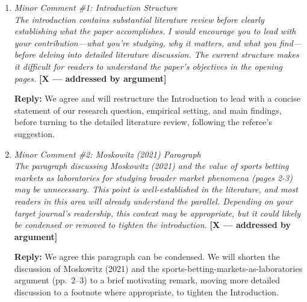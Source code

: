 \documentclass[letterpaper,12pt]{article}
\newcounter{b}
\newcommand{\argX}{\textcolor{green!55!black}{\textbf{[X --- addressed by argument]}}}
\newcommand{\Reply}[1]{\par\noindent\textbf{Reply:} #1}
\begin{document}
\begin{enumerate}
\Reply{We agree the learning-rate magnitudes need a more concrete interpretation. Because our estimating relationship implies $p_t - \omega = \varepsilon / t^\gamma \cdot \sigma$, the implied pricing error shrinks proportionally to $t^{-\gamma}$. We can use this relationship to translate $\gamma$ into an interpretable half-life: the (percentile) time needed for the expected squared pricing error to halve, relative to a reference percentile $t_0$, is $t_{1/2} = 2^{1/(2\gamma)} \cdot t_0$. We will add this calculation to Section~5.5, evaluated at our estimated average learning rate and, separately, at the favorite and longshot medians reported in Section~5.5, together with a short worked numerical example, so that readers can translate an abstract learning-rate estimate into an intuitive statement about how much of the betting window is needed for the pricing error to fall by half.}



\item \textit{Minor Comment \#1: Introduction Structure\\[6pt]
The introduction contains substantial literature review before clearly establishing what the paper accomplishes. I would encourage you to lead with your contribution—what you're studying, why it matters, and what you find—before delving into detailed literature discussion. The current structure makes it difficult for readers to understand the paper's objectives in the opening pages.} \argX

\Reply{We agree and will restructure the Introduction to lead with a concise statement of our research question, empirical setting, and main findings, before turning to the detailed literature review, following the referee's suggestion.}

\item \textit{Minor Comment \#2: Moskowitz (2021) Paragraph\\[6pt]
The paragraph discussing Moskowitz (2021) and the value of sports betting markets as laboratories for studying broader market phenomena (pages 2-3) may be unnecessary. This point is well-established in the literature, and most readers in this area will already understand the parallel. Depending on your target journal's readership, this context may be appropriate, but it could likely be condensed or removed to tighten the introduction.} \argX

\Reply{We agree this paragraph can be condensed. We will shorten the discussion of Moskowitz (2021) and the sports-betting-markets-as-laboratories argument (pp.~2--3) to a brief motivating remark, moving more detailed discussion to a footnote where appropriate, to tighten the Introduction.}


\end{enumerate}
\end{document}
